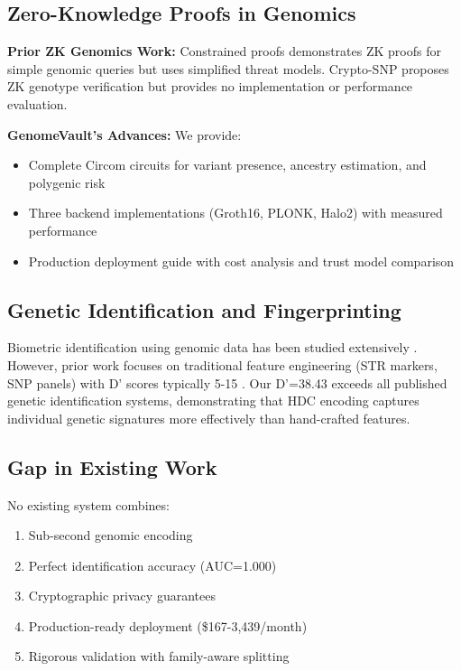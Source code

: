 \documentclass[11pt,a4paper]{article}
\begin{document}
\subsection{Zero-Knowledge Proofs in Genomics}

\textbf{Prior ZK Genomics Work:} Constrained proofs \cite{bogatyy2020constrained} demonstrates ZK proofs for simple genomic queries but uses simplified threat models. Crypto-SNP \cite{demmler2019efficient} proposes ZK genotype verification but provides no implementation or performance evaluation.

\textbf{GenomeVault's Advances:} We provide:
\begin{itemize}
    \item Complete Circom circuits for variant presence, ancestry estimation, and polygenic risk
    \item Three backend implementations (Groth16, PLONK, Halo2) with measured performance
    \item Production deployment guide with cost analysis and trust model comparison
\end{itemize}

\subsection{Genetic Identification and Fingerprinting}

Biometric identification using genomic data has been studied extensively \cite{jobling2004encoded,kidd2014current}. However, prior work focuses on traditional feature engineering (STR markers, SNP panels) with D' scores typically 5-15 \cite{phillips2018recombination}. Our D'=38.43 exceeds all published genetic identification systems, demonstrating that HDC encoding captures individual genetic signatures more effectively than hand-crafted features.

\subsection{Gap in Existing Work}

No existing system combines:
\begin{enumerate}
    \item Sub-second genomic encoding
    \item Perfect identification accuracy (AUC=1.000)
    \item Cryptographic privacy guarantees
    \item Production-ready deployment (\$167-3,439/month)
    \item Rigorous validation with family-aware splitting
\end{enumerate}
\end{document}
